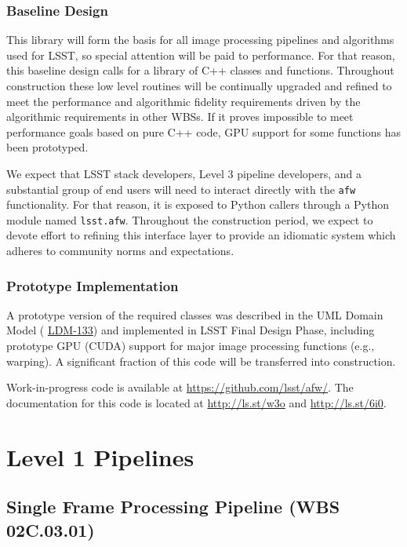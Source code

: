 \documentclass[12pt]{article}
\newcommand{\ds}[2]{{\color{blue} \href{https://docushare.lsstcorp.org/docushare/dsweb/Get/#1}{#2}}\xspace}
\newcommand{\appsUMLdomain}{\ds{LDM-133}{LDM-133}}
\newcommand{\wbsSFM}{WBS 02C.03.01}
\begin{document}
\subsubsection{Baseline Design}

This library will form the basis for all image processing pipelines and algorithms used for LSST, so special attention will be paid to performance. For that reason, this baseline design calls for a library of C++ classes and functions. Throughout construction these low level routines will be continually upgraded and refined to meet the performance and algorithmic fidelity requirements driven by the algorithmic requirements in other WBSs. If it proves impossible to meet performance goals based on pure C++ code, GPU support for some functions has been prototyped.

We expect that LSST stack developers, Level 3 pipeline developers, and a substantial group of end users will need to interact directly with the \texttt{afw} functionality. For that reason, it is exposed to Python callers through a Python module named \texttt{lsst.afw}. Throughout the construction period, we expect to devote effort to refining this interface layer to provide an idiomatic system which adheres to community norms and expectations.

\subsubsection{Prototype Implementation}

A prototype version of the required classes was described in the UML Domain Model (\appsUMLdomain{}) and implemented in LSST Final Design Phase, including prototype GPU (CUDA) support for major image processing functions (e.g., warping). A significant fraction of this code will be transferred into construction.

Work-in-progress code is available at \url{https://github.com/lsst/afw/}. The documentation for this code is located at \url{http://ls.st/w3o} and \url{http://ls.st/6i0}.

\clearpage

\section{Level 1 Pipelines}

\subsection{Single Frame Processing Pipeline (\wbsSFM)}
\end{document}
